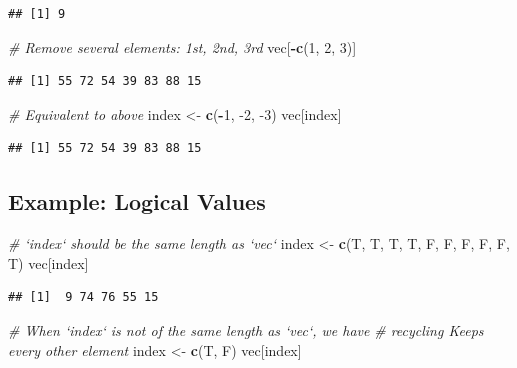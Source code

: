 \documentclass[
]{book}
\newenvironment{Shaded}{\begin{snugshade}}{\end{snugshade}}
\newcommand{\CommentTok}[1]{\textcolor[rgb]{0.56,0.35,0.01}{\textit{#1}}}
\newcommand{\DecValTok}[1]{\textcolor[rgb]{0.00,0.00,0.81}{#1}}
\newcommand{\KeywordTok}[1]{\textcolor[rgb]{0.13,0.29,0.53}{\textbf{#1}}}
\newcommand{\NormalTok}[1]{#1}
\newcommand{\OperatorTok}[1]{\textcolor[rgb]{0.81,0.36,0.00}{\textbf{#1}}}
\newcommand{\StringTok}[1]{\textcolor[rgb]{0.31,0.60,0.02}{#1}}
\begin{document}
\begin{verbatim}
## [1] 9
\end{verbatim}

\begin{Shaded}
\begin{Highlighting}[]
\CommentTok{# Remove several elements: 1st, 2nd, 3rd}
\NormalTok{vec[}\OperatorTok{-}\KeywordTok{c}\NormalTok{(}\DecValTok{1}\NormalTok{, }\DecValTok{2}\NormalTok{, }\DecValTok{3}\NormalTok{)]}
\end{Highlighting}
\end{Shaded}

\begin{verbatim}
## [1] 55 72 54 39 83 88 15
\end{verbatim}

\begin{Shaded}
\begin{Highlighting}[]
\CommentTok{# Equivalent to above}
\NormalTok{index <-}\StringTok{ }\KeywordTok{c}\NormalTok{(}\OperatorTok{-}\DecValTok{1}\NormalTok{, }\DecValTok{-2}\NormalTok{, }\DecValTok{-3}\NormalTok{)}
\NormalTok{vec[index]}
\end{Highlighting}
\end{Shaded}

\begin{verbatim}
## [1] 55 72 54 39 83 88 15
\end{verbatim}

\hypertarget{example-logical-values}{%
\subsection*{Example: Logical Values}\label{example-logical-values}}

\begin{Shaded}
\begin{Highlighting}[]
\CommentTok{# `index` should be the same length as `vec`}
\NormalTok{index <-}\StringTok{ }\KeywordTok{c}\NormalTok{(T, T, T, T, F, F, F, F, F, T)}
\NormalTok{vec[index]}
\end{Highlighting}
\end{Shaded}

\begin{verbatim}
## [1]  9 74 76 55 15
\end{verbatim}

\begin{Shaded}
\begin{Highlighting}[]
\CommentTok{# When `index` is not of the same length as `vec`, we have}
\CommentTok{# recycling Keeps every other element}
\NormalTok{index <-}\StringTok{ }\KeywordTok{c}\NormalTok{(T, F)}
\NormalTok{vec[index]}
\end{Highlighting}
\end{Shaded}
\end{document}
